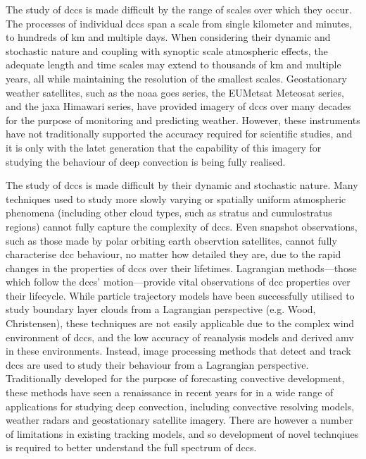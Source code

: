 The study of \acrshort{dcc}s is made difficult by the range of scales over which they occur.
The processes of individual \acrshort{dcc}s span a scale from single kilometer and minutes, to hundreds of km and multiple days.
When considering their dynamic and stochastic nature and coupling with synoptic scale atmospheric effects, the adequate length and time scales may extend to thousands of km and multiple years, all while maintaining the resolution of the smallest scales.
Geostationary weather satellites, such as the \acrshort{noaa} \acrshort{goes} series, the EUMetsat Meteosat series, and the \acrshort{jaxa} Himawari series, have provided imagery of \acrshort{dcc}s over many decades for the purpose of monitoring and predicting weather.
However, these instruments have not traditionally supported the accuracy required for scientific studies, and it is only with the latet generation that the capability of this imagery for studying the behaviour of deep convection is being fully realised.

The study of \acrshort{dcc}s is made difficult by their dynamic and stochastic nature.
Many techniques used to study more slowly varying or spatially uniform atmospheric phenomena (including other cloud types, such as stratus and cumulostratus regions) cannot fully capture the complexity of \acrshort{dcc}s.
Even snapshot observations, such as those made by polar orbiting earth observtion satellites, cannot fully characterise \acrshort{dcc} behaviour, no matter how detailed they are, due to the rapid changes in the properties of \acrshort{dcc}s over their lifetimes.
Lagrangian methods---those which follow the \acrshort{dcc}s' motion---provide vital observations of \acrshort{dcc} properties over their lifecycle.
While particle trajectory models have been successfully utilised to study boundary layer clouds from a Lagrangian perspective (e.g. Wood, Christensen), these techniques are not easily applicable due to the complex wind environment of \acrshort{dcc}s, and the low accuracy of reanalysis models and derived \acrshort{amv} in these environments.
Instead, image processing methods that detect and track \acrshort{dcc}s are used to study their behaviour from a Lagrangian perspective.
Traditionally developed for the purpose of forecasting convective development, these methods have seen a renaissance in recent years for in a wide range of applications for studying deep convection, including convective resolving models, weather radars and geostationary satellite imagery.
There are however a number of limitations in existing tracking models, and so development of novel technqiues is required to better understand the full spectrum of \acrshort{dcc}s.

